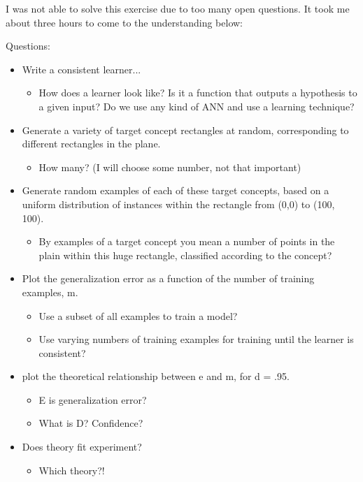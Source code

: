\documentclass[paper=a4, fontsize=11pt]{scrartcl} %
\numberwithin{equation}{section} %
\numberwithin{figure}{section} %
\numberwithin{table}{section} %
\begin{document}
I was not able to solve this exercise due to too many open questions. It took me about three hours to come to the understanding below:\vspace{5mm}

Questions:
\begin{itemize}
	\item Write a consistent learner...
	\begin{itemize}
		\item How does a learner look like? Is it a function that outputs a hypothesis to a given input? Do we use any kind of ANN and use a learning technique?
	\end{itemize}
	\item Generate a variety of target concept rectangles at random, corresponding to different rectangles in the plane.
	\begin{itemize}
		\item How many? (I will choose some number, not that important)
	\end{itemize}
	\item Generate random examples of each of these target concepts, based on a uniform distribution of instances within the rectangle from (0,0) to (100, 100).
	\begin{itemize}
		\item By examples of a target concept you mean a number of points in the plain within this huge rectangle, classified according to the concept?
	\end{itemize}
	\item Plot the generalization error as a function of the number of training examples, m.
	\begin{itemize}
		\item Use a subset of all examples to train a model?
		\item Use varying numbers of training examples for training until the learner is consistent?
	\end{itemize}
	\item plot the theoretical relationship between e and m, for d = .95.
	\begin{itemize}
		\item E is generalization error?
		\item What is D? Confidence?
	\end{itemize}
	\item Does theory fit experiment?
	\begin{itemize}
		\item Which theory?!
	\end{itemize}
\end{itemize}
\end{document}
